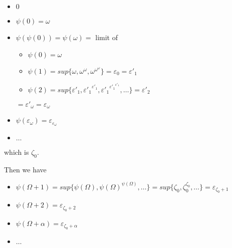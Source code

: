 \documentclass[10pt]{article}
\begin{document}
\begin{itemize}
     \setlength{\itemsep}{1pt}
     \setlength{\parskip}{0pt}
     \setlength{\parsep}{0pt}
\item \( 0 \)
\item \( \psi(0) = \omega \)
\item \( \psi(\psi(0)) = \psi(\omega) = \) limit of
	\begin{itemize}
	     \setlength{\itemsep}{1pt}
	     \setlength{\parskip}{0pt}
	     \setlength{\parsep}{0pt}
	\item \( \psi(0) = \omega \)
	\item \( \psi(1) =  sup \lbrace \omega, \omega^\omega, \omega^{\omega^\omega} \rbrace = \varepsilon_0 = \varepsilon'_1 \)
	\item \( \psi(2) = sup \lbrace \varepsilon'_1, {\varepsilon'_1}^{\varepsilon'_1}, {\varepsilon'_1}^{{\varepsilon'_1}^{\varepsilon'_1}}, \ldots \rbrace = \varepsilon'_2 \)
	\end{itemize}
	\( = \varepsilon'_\omega = \varepsilon_\omega \)
\item \( \psi(\varepsilon_\omega) = \varepsilon_{\varepsilon_\omega} \)
\item \( \ldots \)
\end{itemize}

which is \( \zeta_0 \).

Then we have

\begin{itemize}
     \setlength{\itemsep}{1pt}
     \setlength{\parskip}{0pt}
     \setlength{\parsep}{0pt}
\item \( \psi(\Omega+1) = sup \lbrace \psi(\Omega), \psi(\Omega)^{\psi(\Omega)}, \ldots \rbrace = sup \lbrace \zeta_0, \zeta_0^{\zeta_0}, \ldots \rbrace = \varepsilon_{\zeta_0+1} \)
\item \( \psi(\Omega+2) = \varepsilon_{\zeta_0+2} \)
\item \( \psi(\Omega+\alpha) = \varepsilon_{\zeta_0+\alpha} \)

\item \( \ldots \)
\end{itemize}

\bigskip
\end{document}
